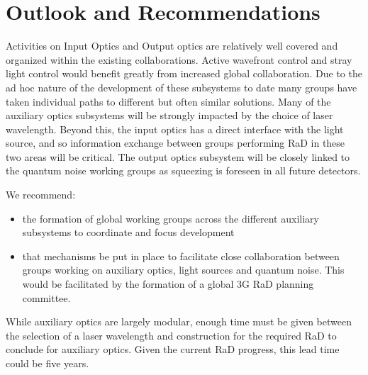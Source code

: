 \section{Outlook and Recommendations}

Activities on Input Optics and Output optics are relatively well covered and organized within the existing collaborations. Active wavefront control and stray light control would benefit greatly from increased global collaboration. Due to the ad hoc nature of the development of these subsystems to date many groups have taken individual paths to different but often similar solutions. Many of the auxiliary optics subsystems will be strongly impacted by the choice of laser wavelength. Beyond this, the input optics has a direct interface with the light source, and so information exchange between groups performing \ac{RaD}  in these two areas will be critical. The output optics subsystem will be closely linked to the quantum noise working groups as squeezing is foreseen in all future detectors. 

We recommend:
\begin{itemize}
\item the formation of global working groups across the different auxiliary subsystems to coordinate and focus development
\item  that mechanisms be put in place to facilitate close collaboration between groups working on auxiliary optics, light sources and quantum noise.  This would be facilitated by the formation of a global \ac{3G}   \ac{RaD}  planning committee.
\end{itemize}
While auxiliary optics are largely modular, enough time must be given between the selection of a laser wavelength and construction for the required \ac{RaD}  to conclude for auxiliary optics. Given the current \ac{RaD}  progress, this lead time could be five years. 




